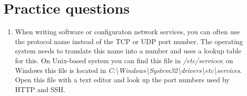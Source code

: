 \section{Practice questions}
\begin{enumerate}
\item
   When writing software or configuraton network services, you can often use the protocol name instead of the \acs{TCP} or \acs{UDP} port number.
   The operating system needs to translate this name into a number and uses a lookup table for this.
   On Unix-based system you can find this file in \emph{/etc/services};
   on Windows this file is located in \emph{C:\textbackslash{}Windows\textbackslash{}System32\textbackslash{}drivers\textbackslash{}etc\textbackslash{}services}.
   Open this file with a text editor and look up the port numbers used by \acs{HTTP} and \acs{SSH}.
\end{enumerate}
